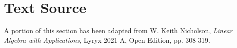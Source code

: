 \documentclass{ximera}
\begin{document}







\section*{Text Source}
A portion of this section has been adapted from
W. Keith Nicholson, {\it Linear Algebra with Applications}, Lyryx 2021-A, Open Edition, pp. 308-319.
\end{document}
